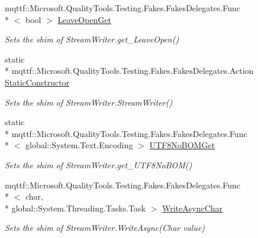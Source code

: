 \begin{DoxyCompactItemize}
mqttf\-::\-Microsoft.\-Quality\-Tools.\-Testing.\-Fakes.\-Fakes\-Delegates.\-Func\\*
$<$ bool $>$ \hyperlink{class_system_1_1_i_o_1_1_fakes_1_1_shim_stream_writer_acd92ae61881f4025c97255bed2203985}{Leave\-Open\-Get}
\begin{DoxyCompactList}\small\item\em Sets the shim of Stream\-Writer.\-get\-\_\-\-Leave\-Open()\end{DoxyCompactList}\item 
static \\*
mqttf\-::\-Microsoft.\-Quality\-Tools.\-Testing.\-Fakes.\-Fakes\-Delegates.\-Action \hyperlink{class_system_1_1_i_o_1_1_fakes_1_1_shim_stream_writer_a306f17a147cdfad0c292e3c6cf1b470f}{Static\-Constructor}
\begin{DoxyCompactList}\small\item\em Sets the shim of Stream\-Writer.\-Stream\-Writer()\end{DoxyCompactList}\item 
static \\*
mqttf\-::\-Microsoft.\-Quality\-Tools.\-Testing.\-Fakes.\-Fakes\-Delegates.\-Func\\*
$<$ global\-::\-System.\-Text.\-Encoding $>$ \hyperlink{class_system_1_1_i_o_1_1_fakes_1_1_shim_stream_writer_a60aee5d612752d20cf3307f7cf96613a}{U\-T\-F8\-No\-B\-O\-M\-Get}
\begin{DoxyCompactList}\small\item\em Sets the shim of Stream\-Writer.\-get\-\_\-\-U\-T\-F8\-No\-B\-O\-M()\end{DoxyCompactList}\item 
mqttf\-::\-Microsoft.\-Quality\-Tools.\-Testing.\-Fakes.\-Fakes\-Delegates.\-Func\\*
$<$ char, \\*
global\-::\-System.\-Threading.\-Tasks.\-Task $>$ \hyperlink{class_system_1_1_i_o_1_1_fakes_1_1_shim_stream_writer_af3395871c3dd37e7a5b32ad12d21db79}{Write\-Async\-Char}
\begin{DoxyCompactList}\small\item\em Sets the shim of Stream\-Writer.\-Write\-Async(\-Char value)\end{DoxyCompactList}\item 

\end{DoxyCompactItemize}
